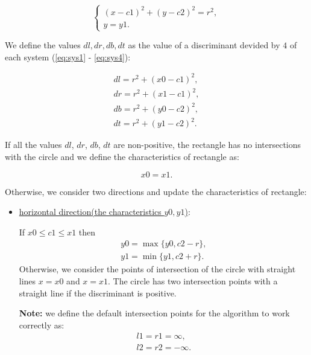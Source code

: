 \documentclass{report}
\begin{document}
\begin{itemize}
		\begin{equation}
			\begin{cases}
				(x - c1)^2 + (y - c2)^2 = r^2,\\ 
	 			y = y1.				
			\end{cases}
		\label{eq:sys4}
		\end{equation}
	
		We define the values $dl, dr, db, dt$ as the value of a discriminant devided by  $4$ of each system (\ref{eq:sys1} - \ref{eq:sys4}):
		 
		 \begin{equation}
		 	\begin{gathered}
		 		dl = r^2 + (x0 - c1)^2,\\
		 		dr = r^2 + (x1 - c1)^2,\\
		 		db = r^2 + (y0 - c2)^2,\\
		 		dt = r^2 + (y1 - c2)^2.
		 	\end{gathered}
		 \end{equation}
		
		If all the values $dl$, $dr$, $db$, $dt$  are non-positive,  the rectangle has no intersections with the circle and we define the characteristics of rectangle as: 
		
		\begin{equation}
			 x0 = x1.
		\end{equation}
	
		Otherwise, we consider two directions and update the characteristics of rectangle:
		
		\begin{itemize}
			
			\item \underline {horizontal direction(the characteristics $y0, y1$)}:
			
			If   $x0 \le c1\le x1$ then
			\begin{equation}
				\begin{gathered}
					y0 = \max\{y0, c2-r\},\\
					y1 = \min\{y1, c2+r\}.
				\end{gathered}
			\end{equation}
			Otherwise, we consider the points of intersection of the circle with straight lines $x = x0$ and $x = x1$. The circle has two intersection points with a straight line if the discriminant is positive.
			
			{\bfseries Note:} we define the default intersection points for the algorithm to work correctly as:
			\begin{equation}
				\begin{gathered}
				l1 = r1 =  \infty,\\
				l2 = r2 = -\infty.
				\end{gathered}
			\end{equation}
		

\end{itemize}
\end{itemize}
\end{document}
